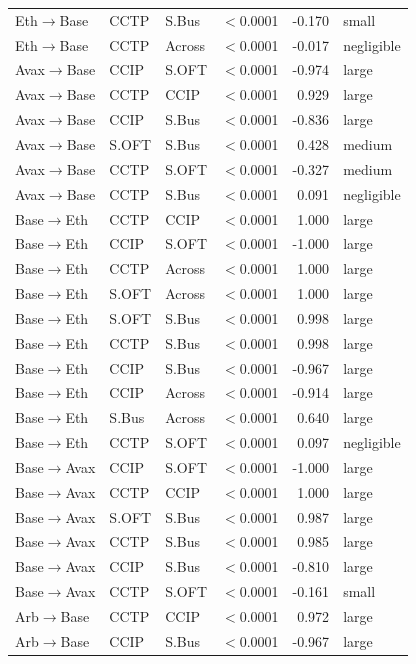 \begin{table}[ht]
\begin{tabular}{lllrrl}
Eth$\to$Base & CCTP & S.Bus & $<$0.0001 & -0.170 & small \\
Eth$\to$Base & CCTP & Across & $<$0.0001 & -0.017 & negligible \\
\midrule
Avax$\to$Base & CCIP & S.OFT & $<$0.0001 & -0.974 & large \\
Avax$\to$Base & CCTP & CCIP & $<$0.0001 & 0.929 & large \\
Avax$\to$Base & CCIP & S.Bus & $<$0.0001 & -0.836 & large \\
Avax$\to$Base & S.OFT & S.Bus & $<$0.0001 & 0.428 & medium \\
Avax$\to$Base & CCTP & S.OFT & $<$0.0001 & -0.327 & medium \\
Avax$\to$Base & CCTP & S.Bus & $<$0.0001 & 0.091 & negligible \\
\midrule
Base$\to$Eth & CCTP & CCIP & $<$0.0001 & 1.000 & large \\
Base$\to$Eth & CCIP & S.OFT & $<$0.0001 & -1.000 & large \\
Base$\to$Eth & CCTP & Across & $<$0.0001 & 1.000 & large \\
Base$\to$Eth & S.OFT & Across & $<$0.0001 & 1.000 & large \\
Base$\to$Eth & S.OFT & S.Bus & $<$0.0001 & 0.998 & large \\
Base$\to$Eth & CCTP & S.Bus & $<$0.0001 & 0.998 & large \\
Base$\to$Eth & CCIP & S.Bus & $<$0.0001 & -0.967 & large \\
Base$\to$Eth & CCIP & Across & $<$0.0001 & -0.914 & large \\
Base$\to$Eth & S.Bus & Across & $<$0.0001 & 0.640 & large \\
Base$\to$Eth & CCTP & S.OFT & $<$0.0001 & 0.097 & negligible \\
\midrule
Base$\to$Avax & CCIP & S.OFT & $<$0.0001 & -1.000 & large \\
Base$\to$Avax & CCTP & CCIP & $<$0.0001 & 1.000 & large \\
Base$\to$Avax & S.OFT & S.Bus & $<$0.0001 & 0.987 & large \\
Base$\to$Avax & CCTP & S.Bus & $<$0.0001 & 0.985 & large \\
Base$\to$Avax & CCIP & S.Bus & $<$0.0001 & -0.810 & large \\
Base$\to$Avax & CCTP & S.OFT & $<$0.0001 & -0.161 & small \\
\midrule
Arb$\to$Base & CCTP & CCIP & $<$0.0001 & 0.972 & large \\
Arb$\to$Base & CCIP & S.Bus & $<$0.0001 & -0.967 & large \\

\end{tabular}
\end{table}
